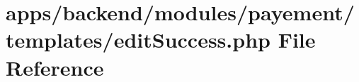 \hypertarget{backend_2modules_2payement_2templates_2edit_success_8php}{\section{apps/backend/modules/payement/templates/edit\-Success.php File Reference}
\label{backend_2modules_2payement_2templates_2edit_success_8php}
}
